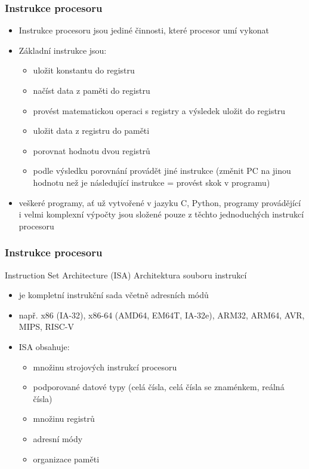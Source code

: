 \documentclass{beamer}
\begin{document}
\begin{frame}
\frametitle{Instrukce procesoru}

\begin{itemize}
\item Instrukce procesoru jsou jediné činnosti, které procesor umí vykonat
\item Základní instrukce jsou:
\begin{itemize}
\item uložit konstantu do registru
\item načíst data z paměti do registru
\item provést matematickou operaci s registry a výsledek uložit do registru
\item uložit data z registru do paměti
\item porovnat hodnotu dvou registrů
\item podle výsledku porovnání provádět jiné instrukce (změnit PC na jinou hodnotu než je následující instrukce = provést skok v programu)
\end{itemize}
\item veškeré programy, ať už vytvořené v jazyku C, Python, programy provádějící i velmi komplexní výpočty jsou složené pouze z těchto jednoduchých instrukcí procesoru
\end{itemize}

\end{frame}

\begin{frame}
\frametitle{Instrukce procesoru}

Instruction Set Architecture (ISA) Architektura souboru instrukcí
\begin{itemize}
\item je kompletní instrukční sada včetně adresních módů
\item např. x86 (IA-32), x86-64 (AMD64, EM64T, IA-32e), ARM32, ARM64, AVR, MIPS, RISC-V
\item ISA obsahuje:
\begin{itemize}
\item množinu strojových instrukcí procesoru
\item podporované datové typy (celá čísla, celá čísla se znaménkem, reálná čísla)
\item množinu registrů
\item adresní módy
\item organizace paměti
\end{itemize}
\end{itemize}

\end{frame}
\end{document}
